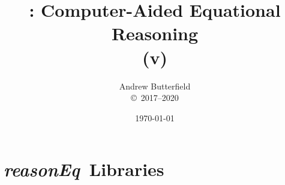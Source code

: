 \documentclass[fleqn,10pt]{report}
\author{
Andrew Butterfield
\\
{\small \copyright\ 2017--2020}
}
\title{
  \reasonEq: Computer-Aided Equational Reasoning
  \\(v\reqVersion)
}
\date{
\today
}
\def\reasonEq{\textit{\textsf{reasonEq}}}
\begin{document}
\maketitle
\tableofcontents

% 

\chapter{\reasonEq\ Libraries}

%
% 
% 
% 
% 
% 
% 
% 
% 
% 
% 
% 
% 
% 
% 
% 
% 
% 
% 
% 
% 
\newpage

% 
% 
% 
% 
% 
% 

%
\newpage
%
%
%
%
\newpage

\newpage
\end{document}
